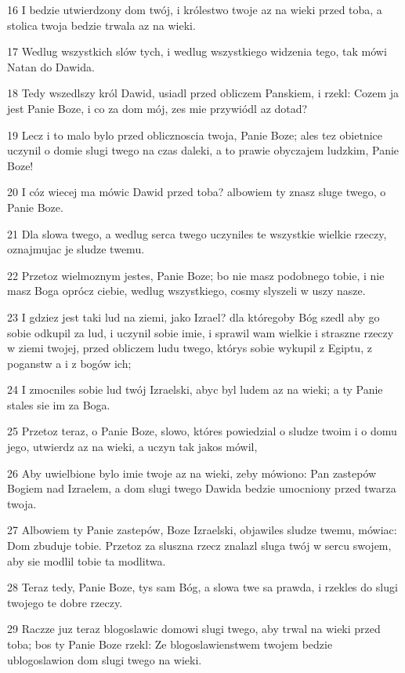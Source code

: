 \par 16 I bedzie utwierdzony dom twój, i królestwo twoje az na wieki przed toba, a stolica twoja bedzie trwala az na wieki.
\par 17 Wedlug wszystkich slów tych, i wedlug wszystkiego widzenia tego, tak mówi Natan do Dawida.
\par 18 Tedy wszedlszy król Dawid, usiadl przed obliczem Panskiem, i rzekl: Cozem ja jest Panie Boze, i co za dom mój, zes mie przywiódl az dotad?
\par 19 Lecz i to malo bylo przed oblicznoscia twoja, Panie Boze; ales tez obietnice uczynil o domie slugi twego na czas daleki, a to prawie obyczajem ludzkim, Panie Boze!
\par 20 I cóz wiecej ma mówic Dawid przed toba? albowiem ty znasz sluge twego, o Panie Boze.
\par 21 Dla slowa twego, a wedlug serca twego uczyniles te wszystkie wielkie rzeczy, oznajmujac je sludze twemu.
\par 22 Przetoz wielmoznym jestes, Panie Boze; bo nie masz podobnego tobie, i nie masz Boga oprócz ciebie, wedlug wszystkiego, cosmy slyszeli w uszy nasze.
\par 23 I gdziez jest taki lud na ziemi, jako Izrael? dla któregoby Bóg szedl aby go sobie odkupil za lud, i uczynil sobie imie, i sprawil wam wielkie i straszne rzeczy w ziemi twojej, przed obliczem ludu twego, którys sobie wykupil z Egiptu, z poganstw a i z bogów ich;
\par 24 I zmocniles sobie lud twój Izraelski, abyc byl ludem az na wieki; a ty Panie stales sie im za Boga.
\par 25 Przetoz teraz, o Panie Boze, slowo, któres powiedzial o sludze twoim i o domu jego, utwierdz az na wieki, a uczyn tak jakos mówil,
\par 26 Aby uwielbione bylo imie twoje az na wieki, zeby mówiono: Pan zastepów Bogiem nad Izraelem, a dom slugi twego Dawida bedzie umocniony przed twarza twoja.
\par 27 Albowiem ty Panie zastepów, Boze Izraelski, objawiles sludze twemu, mówiac: Dom zbuduje tobie. Przetoz za sluszna rzecz znalazl sluga twój w sercu swojem, aby sie modlil tobie ta modlitwa.
\par 28 Teraz tedy, Panie Boze, tys sam Bóg, a slowa twe sa prawda, i rzekles do slugi twojego te dobre rzeczy.
\par 29 Raczze juz teraz blogoslawic domowi slugi twego, aby trwal na wieki przed toba; bos ty Panie Boze rzekl: Ze blogoslawienstwem twojem bedzie ublogoslawion dom slugi twego na wieki.

